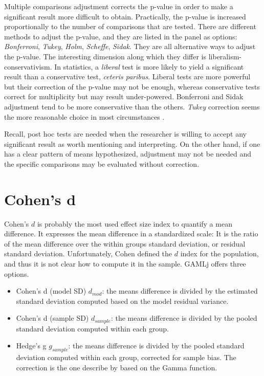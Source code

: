 \documentclass[
]{book}
\begin{document}
Multiple comparisons adjustment corrects the p-value in order to make a significant result more difficult to obtain. Practically, the p-value is increased proportionally to the number of comparisons that are tested. There are different methods to adjust the p-value, and they are listed in the panel as options: \emph{Bonferroni}, \emph{Tukey}, \emph{Holm}, \emph{Scheffe}, \emph{Sidak}. They are all alternative ways to adjust the p-value. The interesting dimension along which they differ is liberalism-conservativism. In statistics, a \emph{liberal} test is more likely to yield a significant result than a conservative test, \emph{ceteris paribus}. Liberal tests are more powerful but their correction of the p-value may not be enough, whereas conservative tests correct for multiplicity but may result under-powered. Bonferroni and Sidak adjustment tend to be more conservative than the others. \emph{Tukey} correction seems the more reasonable choice in most circumstances \citep{midway2020comparing}.

Recall, post hoc tests are needed when the researcher is willing to accept any significant result as worth mentioning and interpreting. On the other hand, if one has a clear pattern of means hypothesized, adjustment may not be needed and the specific comparisons may be evaluated without correction.

\hypertarget{cohens-d}{%
\section{Cohen's d}\label{cohens-d}}

Cohen's \(d\) is probably the most used effect size index to quantify a mean difference. It expresses the mean difference in a standardized scale: It is the ratio of the mean difference over the within groups standard deviation, or residual standard deviation. Unfortunately, Cohen \citep{cohen2013statistical} defined the \(d\) index for the population, and thus it is not clear how to compute it in the sample. {GAMLj} offers three options.

\begin{itemize}
\item
  Cohen's d (model SD) \(d_{mod}\): the means difference is divided by the estimated standard deviation computed based on the model residual variance.
\item
  Cohen's d (sample SD) \(d_{sample}\): the means difference is divided by the pooled standard deviation computed within each group.
\item
  Hedge's g \(g_{sample}\): the means difference is divided by the pooled standard deviation computed within each group, corrected for sample bias. The correction is the one describe by \citet{hedges2014statistical} based on the Gamma function.
\end{itemize}
\end{document}
